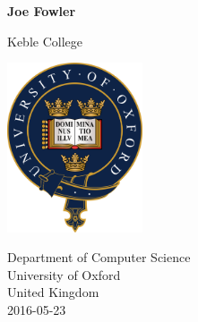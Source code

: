 \begin{titlepage}
    \begin{center}
      \vspace*{1cm}

      \huge
      \textbf{\projecttitle}

      \vspace{0.5cm}
      \large \projectsubtitle

      \vspace{1.5cm}

      \textbf{Joe Fowler}

      Keble College

      \vfill

      \includegraphics[width=0.3\textwidth]{images/OxfordLogo}

      \vspace{1cm}

      \large
      Department of Computer Science\\
      University of Oxford\\
      United Kingdom\\
      2016-05-23
    \end{center}
  \restoregeometry
\end{titlepage}
